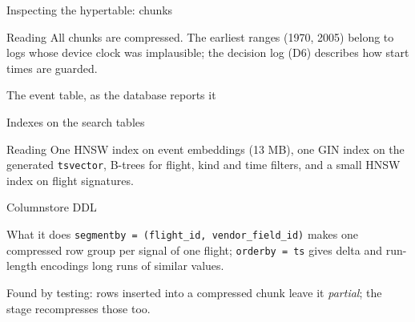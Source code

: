 \documentclass[aspectratio=169,10pt]{beamer}
\newcommand{\code}[1]{\texttt{\footnotesize #1}}
\newcommand{\listing}[1]{}
\newcommand{\terminal}[1]{}
\newcommand{\terminalr}[3]{}
\begin{document}
\begin{frame}{Inspecting the hypertable: chunks}
\begin{block}{Reading}
All chunks are compressed. The earliest ranges (1970, 2005) belong to logs whose device clock was implausible; the decision log (D6) describes how start times are guarded.
\end{block}
\vspace{0.3em}
\terminal{term-chunks}
\end{frame}

\begin{frame}{The event table, as the database reports it}
\terminalr{term-event}{1}{22}
\end{frame}

\begin{frame}{Indexes on the search tables}
\begin{block}{Reading}
One HNSW index on event embeddings (13 MB), one GIN index on the generated \code{tsvector}, B-trees for flight, kind and time filters, and a small HNSW index on flight signatures.
\end{block}
\vspace{0.4em}
\terminal{term-indexes}
\end{frame}

\begin{frame}{Columnstore DDL}
\begin{block}{What it does}
\code{segmentby = (flight\_id, vendor\_field\_id)} makes one compressed row group per signal of one flight; \code{orderby = ts} gives delta and run-length encodings long runs of similar values.
\end{block}
\vspace{0.4em}
\listing{code-columnstore-ddl}
\vspace{0.4em}
\listing{code-compress}
\vspace{0.3em}
{\footnotesize Found by testing: rows inserted into a compressed chunk leave it \emph{partial}; the stage recompresses those too.}
\end{frame}
\end{document}
